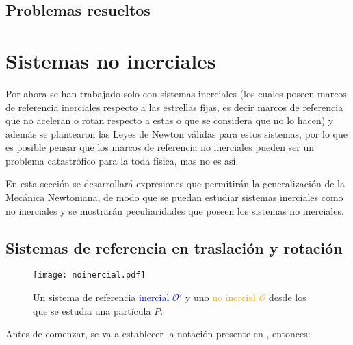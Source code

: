 \documentclass[/home/hernan-barquero/Documents/Apuntes_mecanica_teorica/main.tex]{subfiles}
\begin{document}
	\subsection{Problemas resueltos}


	
	
	\section{Sistemas no inerciales}
	\label{sec: noinerciales}

	Por ahora se han trabajado solo con sistemas inerciales (los cuales poseen marcos de referencia inerciales respecto a las estrellas fijas, es decir marcos de referencia que no aceleran o rotan respecto a estas o que se considera que no lo hacen) y además se plantearon las Leyes de Newton válidas para estos sistemas, por lo que es posible pensar que los marcos de referencia no inerciales pueden ser un problema catastrófico para la toda física, mas no es así. 

	En esta sección se desarrollará expresiones que permitirán la generalización de la Mecánica Newtoniana, de modo que se puedan estudiar sistemas inerciales como no inerciales y se mostrarán peculiaridades que poseen los sistemas no inerciales.

	\subsection{Sistemas de referencia en traslación y rotación}

	\begin{marginfigure}
        \begin{figure}[H]
            \centering
            \texttt{[image: noinercial.pdf]}
            \caption{Un sistema de referencia \textcolor{blue}{inercial ${\mathcal{O}}'$}  y uno \textcolor{orange}{no inercial $\mathcal{O}$} desde los que se estudia una partícula $P$.}
            \label{fig: noinercial}
        \end{figure}
    \end{marginfigure}

	Antes de comenzar, se va a establecer la notación presente en , entonces:
\end{document}
